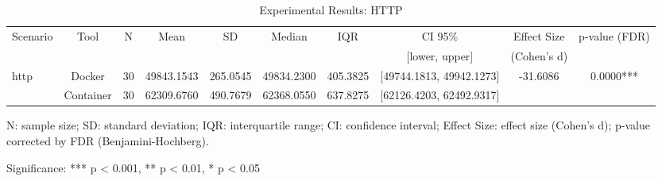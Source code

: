 \documentclass{article}
\begin{document}

\begin{table}[h]
\centering
\small
\caption{Experimental Results: HTTP}
\label{tab:http}
\begin{tabular}{lccccccccc}
\toprule
Scenario & Tool & N & Mean & SD & Median & IQR & CI 95\% & Effect Size & p-value (FDR) \\
 & & & & & & & [lower, upper] & (Cohen's d) & \\
\midrule
\multirow{2}{*}{http} & Docker & 30 & 49843.1543 & 265.0545 & 49834.2300 & 405.3825 & [49744.1813, 49942.1273] & -31.6086 & 0.0000*** \\
 & Container & 30 & 62309.6760 & 490.7679 & 62368.0550 & 637.8275 & [62126.4203, 62492.9317] &  &  \\
\midrule
\bottomrule
\end{tabular}
\begin{tablenotes}
\small
\item N: sample size; SD: standard deviation; IQR: interquartile range; CI: confidence interval; Effect Size: effect size (Cohen's d); p-value corrected by FDR (Benjamini-Hochberg).
\item Significance: *** p < 0.001, ** p < 0.01, * p < 0.05
\end{tablenotes}
\end{table}
\end{document}
